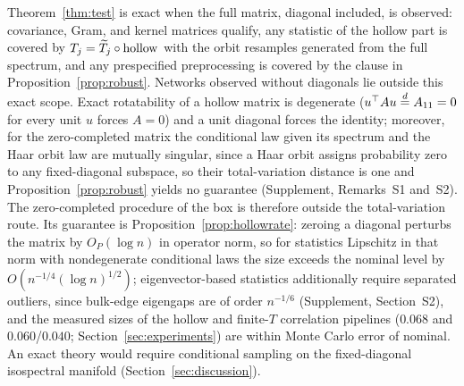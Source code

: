 \begin{remark}
\label{rem:hollow}
Theorem~\ref{thm:test} is exact when the full matrix, diagonal
included, is observed: covariance, Gram, and kernel matrices qualify,
any statistic of the hollow part is covered by
$T_j=\widetilde T_j\circ\operatorname{hollow}$ with the orbit resamples generated
from the full spectrum, and any prespecified preprocessing is covered
by the clause in Proposition~\ref{prop:robust}. Networks observed without diagonals lie outside this exact scope. Exact rotatability of a
hollow matrix is degenerate ($u^\top Au\overset{d}{=} A_{11}=0$ for every unit
$u$ forces $A=0$) and a unit diagonal forces the identity; moreover,
for the zero-completed matrix the conditional law given its spectrum
and the Haar orbit law are mutually singular, since a Haar orbit
assigns probability zero to any fixed-diagonal subspace, so their
total-variation distance is one and
Proposition~\ref{prop:robust} yields no guarantee (Supplement,
Remarks~S1 and~S2). The zero-completed procedure of the box is therefore outside the
total-variation route. Its guarantee is
Proposition~\ref{prop:hollowrate}: zeroing a diagonal perturbs the matrix by $O_P(\log n)$ in operator
norm, so for statistics Lipschitz in that norm with nondegenerate
conditional laws the size exceeds the nominal level by
$O(n^{-1/4}(\log n)^{1/2})$; eigenvector-based statistics additionally
require separated outliers, since bulk-edge eigengaps are of order
$n^{-1/6}$ (Supplement, Section~S2), and the measured sizes of the hollow and
finite-$T$ correlation pipelines ($0.068$ and $0.060$/$0.040$;
Section~\ref{sec:experiments}) are within Monte Carlo error of
nominal. An exact theory would require conditional sampling on the
fixed-diagonal isospectral manifold (Section~\ref{sec:discussion}).
\end{remark}



